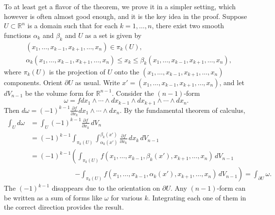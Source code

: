 \documentclass[12pt,openany]{book}
\newcommand{\R}{{\mathbb{R}}}
\theoremstyle{plain}
\theoremstyle{remark}
\theoremstyle{definition}
\theoremstyle{exercise}
\theoremstyle{example}
\begin{document}
To at least get a flavor of the theorem, we prove it in a simpler
setting, which however is often almost good enough, and it is the key idea
in the proof.
Suppose $U \subset \R^n$ is a domain such that for each $k=1,\ldots,n$,
there exist two smooth functions $\alpha_k$ and $\beta_k$ and $U$
as a set is given by
\begin{equation*}
\begin{aligned}
& (x_1,\ldots,x_{k-1},x_{k+1},\ldots,x_n) \in \pi_k(U) ,
\\
& \alpha_k(x_1,\ldots,x_{k-1},x_{k+1},\ldots,x_n)
\leq x_k \leq
\beta_k(x_1,\ldots,x_{k-1},x_{k+1},\ldots,x_n) ,
\end{aligned}
\end{equation*}
where $\pi_k(U)$ is the projection of $U$ onto the
$(x_1,\ldots,x_{k-1},x_{k+1},\ldots,x_n)$ components.
Orient $\partial U$ as usual.
Write $x' = (x_1,\ldots,x_{k-1},x_{k+1},\ldots,x_n)$, and let $dV_{n-1}$ be the
volume form for $\R^{n-1}$.
Consider the $(n-1)$-form
\begin{equation*}
\omega = f
dx_1 \wedge \cdots \wedge dx_{k-1} \wedge dx_{k+1} \wedge \cdots \wedge dx_n
.
\end{equation*}
Then $d\omega = {(-1)}^{k-1} \frac{\partial f}{\partial x_k} dx_1 \wedge \cdots \wedge
dx_n$.
By the fundamental theorem of
calculus,
\begin{equation*}
\begin{split}
\int_U d\omega &=
\int_U {(-1)}^{k-1} \frac{\partial f}{\partial x_k} \, dV_n
\\
& =
{(-1)}^{k-1}
\int_{\pi_k(U)}
\int_{\alpha_k(x')}^{\beta_k(x')}
\frac{\partial f}{\partial x_k} \, dx_k \, dV_{n-1}
\\
& =
{(-1)}^{k-1}
\left(
\int_{\pi_k(U)}
f(x_1,\ldots,x_{k-1}, \beta_k(x'), x_{k+1}, \ldots, x_n)
\,dV_{n-1}
\right.
\\
& \phantom{={(-1)}^{k-1}x}
\left.
-
\int_{\pi_k(U)}
f(x_1,\ldots,x_{k-1}, \alpha_k(x'), x_{k+1}, \ldots, x_n)
\,dV_{n-1}
\right)
=
\int_{\partial U} \omega .
\end{split}
\end{equation*}
The $(-1)^{k-1}$ disappears due to the orientation on $\partial U$.
Any $(n-1)$-form can be written as a sum of forms like $\omega$ for various
$k$.  Integrating each one of them in the correct direction provides the
result.

\end{document}

